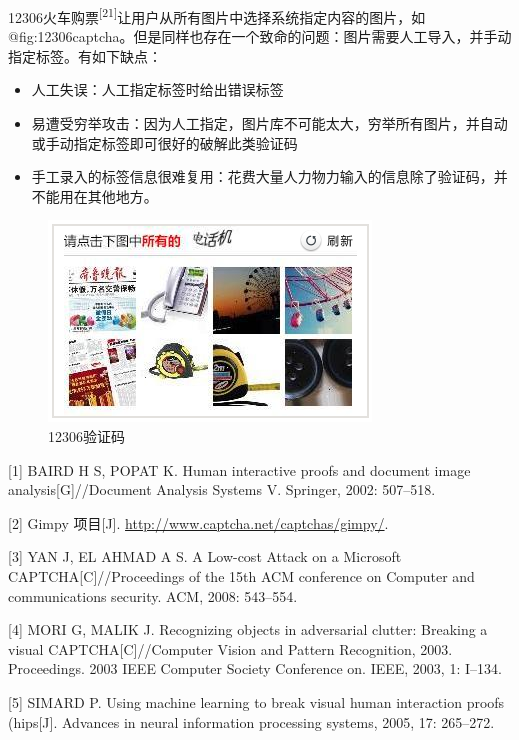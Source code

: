 \documentclass[bachelor,zhspacing]{cqu}  %
\begin{document}
12306火车购票\textsuperscript{{[}21{]}}让用户从所有图片中选择系统指定内容的图片，如@fig:12306captcha。但是同样也存在一个致命的问题：图片需要人工导入，并手动指定标签。有如下缺点：

\begin{itemize}
\tightlist
\item
  人工失误：人工指定标签时给出错误标签
\item
  易遭受穷举攻击：因为人工指定，图片库不可能太大，穷举所有图片，并自动或手动指定标签即可很好的破解此类验证码
\item
  手工录入的标签信息很难复用：花费大量人力物力输入的信息除了验证码，并不能用在其他地方。
\end{itemize}

\begin{figure}[htbp]
\centering
\includegraphics{pic/12306captcha.png}
\caption{12306验证码}\label{fig:12306captcha}
\end{figure}

\hypertarget{refs}{}
\hypertarget{ref-baird2002human}{}
{[}1{]} BAIRD H S, POPAT K. Human interactive proofs and document image
analysis{[}G{]}//Document Analysis Systems V. Springer, 2002: 507--518.

\hypertarget{ref-gimpy}{}
{[}2{]} Gimpy 项目{[}J{]}. \url{http://www.captcha.net/captchas/gimpy/}.

\hypertarget{ref-yan2008low}{}
{[}3{]} YAN J, EL AHMAD A S. A Low-cost Attack on a Microsoft
CAPTCHA{[}C{]}//Proceedings of the 15th ACM conference on Computer and
communications security. ACM, 2008: 543--554.

\hypertarget{ref-mori2003recognizing}{}
{[}4{]} MORI G, MALIK J. Recognizing objects in adversarial clutter:
Breaking a visual CAPTCHA{[}C{]}//Computer Vision and Pattern
Recognition, 2003. Proceedings. 2003 IEEE Computer Society Conference
on. IEEE, 2003, 1: I--134.

\hypertarget{ref-simard2005using}{}
{[}5{]} SIMARD P. Using machine learning to break visual human
interaction proofs (hips{[}J{]}. Advances in neural information
processing systems, 2005, 17: 265--272.
\end{document}
